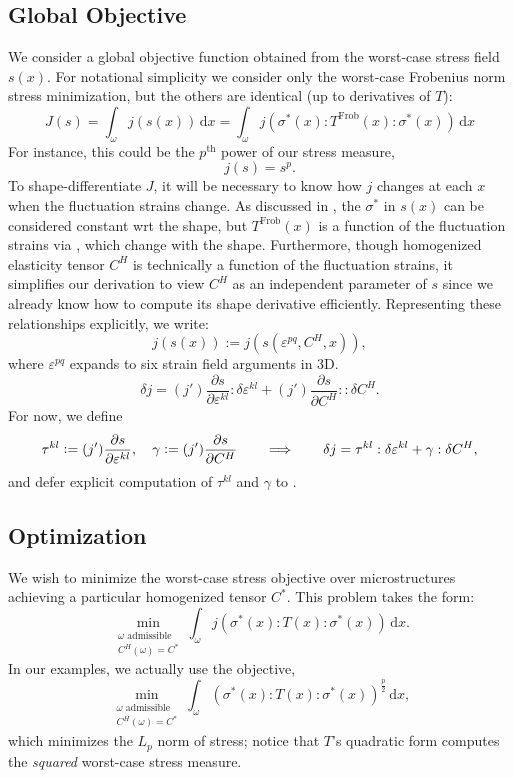 \documentclass[10pt]{article}
\providecommand{\vint}[3][x]{\int_{#2} \! #3 \, \mathrm{d}#1}
\providecommand{\pder}[2]{\frac{\partial #1}{\partial #2}}
\newcommand\pr[1]{\prettyref{#1}}
\def\strain{\varepsilon}
\newcommand{\defeq}{\vcentcolon=}
\begin{document}
\subsection{Global Objective}
We consider a global objective function obtained from the worst-case stress
field $s(x)$. For notational simplicity we consider only the worst-case
Frobenius norm stress minimization, but the others are identical (up to derivatives of $T$):
$$
J(s) = \vint{\omega}{j(s(x))} = \vint{\omega}{j(\sigma^*(x) : T^\text{Frob}(x) : \sigma^*(x))}
$$
For instance, this could be the $p^\text{th}$ power of our stress measure,
$$
j(s) = s^p.
$$
To shape-differentiate $J$, it will be necessary to know how $j$
changes at each $x$ when the fluctuation strains change.
As discussed in \pr{sec:eigen_deriv}, 
the $\sigma^*$ in $s(x)$ can be considered constant wrt the shape, but $T^\text{Frob}(x)$ is a function of
the fluctuation strains via \pr{eqn:macro_micro}, which change with the shape.
Furthermore, though homogenized elasticity tensor $C^H$ is
technically a function of the fluctuation strains, it simplifies our derivation
to view $C^H$ as an independent parameter of $s$ since we already know how to compute
its shape derivative efficiently.
Representing these relationships explicitly, we write:
$$
j(s(x)) := j(s(\strain^{pq}, C^H, x)),
$$
where $\strain^{pq}$ expands to six strain field arguments in 3D.
$$
\delta j = (j')\pder{s}{\strain^{kl}} : \delta \strain^{kl} + (j')\pder{s}{C^H} :: \delta C^H.
$$
For now, we define
$$
\tau^{kl} \defeq (j')\pder{s}{\strain^{kl}}, \quad \gamma \defeq (j')\pder{s}{C^H}
\quad \quad \Longrightarrow \quad \quad \delta j = \tau^{kl} : \delta \strain^{kl} + \gamma : \delta C^H,
$$
and defer explicit computation of $\tau^{kl}$ and $\gamma$ to \pr{sec:tau}.

\subsection{Optimization}
We wish to minimize the worst-case stress objective over microstructures
achieving a particular homogenized tensor $C^*$.
This problem takes the form:
$$
\min_{\substack{\omega \text{ admissible} \\ C^H(\omega) = C^*}} \vint{\omega}{j(\sigma^*(x) : T(x) : \sigma^*(x))}.
$$
In our examples, we actually use the objective,
$$
\min_{\substack{\omega \text{ admissible} \\ C^H(\omega) = C^*}} \vint{\omega}{(\sigma^*(x) : T(x) : \sigma^*(x))^{\frac{p}{2}}},
$$
which minimizes the $L_p$ norm of stress; notice that $T$'s quadratic form computes the {\em squared} worst-case stress measure.
\end{document}
